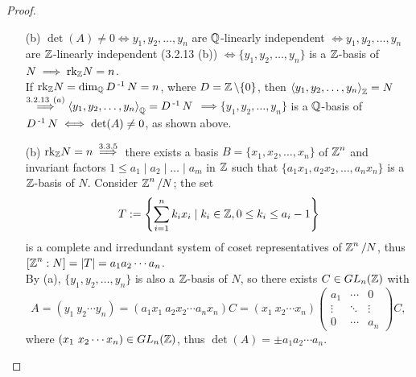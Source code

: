 \documentclass[11pt]{book}
\theoremstyle{definition}   \newtheorem{defn}[counter]{Definition} %
\newcommand{\bs}{\backslash}   \newcommand{\A}{\mathcal{A}}   \newcommand{\sy}{\textnormal{Syl}}   \newcommand{\size}[1]{\left| #1 \right|}
\newcommand{\mymatrix}[2]{\left( \begin{array}{#1} #2 \end{array} \right)}
\newcommand{\gen}[1]{\left\langle #1 \right\rangle}   \newcommand{\stab}[2]{\tn{Stab}_{#1}(#2)}   \newcommand{\fix}[2]{\tn{Fix}_{#1}(#2)}   \newcommand{\op}{^{\tn{op}}}
\newcommand{\vs}{\vspace{8pt}}
\numberwithin{counter}{chapter}
\begin{document}
\vs

\begin{proof}\
\begin{enumerate}
\item[(b)] $\det(A) \ne 0 \iff y_1,y_2,\dots,y_n $ are $\operatorname{\mathbb{Q}}$-linearly independent $\iff y_1,y_2,\dots,y_n$ are $\operatorname{\mathbb{Z}}$-linearly independent (3.2.13 (b)) $\iff \{y_1,y_2,\dots,y_n\}$ is a $\operatorname{\mathbb{Z}}$-basis of $N \implies \textnormal{rk}_{\operatorname{\mathbb{Z}}} N = n$. \\

If $\textnormal{rk}_{\operatorname{\mathbb{Z}}} N = \dim_{\operatorname{\mathbb{Q}}} D\operatorname{^{-1}} N = n$, where $D = \z\bs\{0\}$, then $\gen{y_1,y_2,\dots,y_n}_{\z} = N$ $\overset{3.2.13 \ (a)}{\implies} \gen{y_1,y_2,\dots,y_n}_{\Q} = D\inv N$ $\implies \{y_1,y_2,\dots,y_n\}$ is a $\operatorname{\mathbb{Q}}$-basis of $D\operatorname{^{-1}} N \iff \det (A) \ne 0$, as shown above.
\item[(b)] $\textnormal{rk}_{\operatorname{\mathbb{Z}}} N = n \overset{3.3.5}{\implies}$ there exists a basis $B = \{x_1,x_2,\dots,x_n\}$ of $\operatorname{\mathbb{Z}}^n$ and invariant factors $1 \leq a_1 \mid a_2 \mid \dots \mid a_m$ in $\operatorname{\mathbb{Z}}$ such that $\{a_1x_1,a_2x_2,\dots,a_n x_n\}$ is a $\operatorname{\mathbb{Z}}$-basis of $N$. Consider $\operatorname{\mathbb{Z}}^n/N$; the set
	\[T := \left\{\sum_{i=1}^n k_i x_i \mid k_i \in \operatorname{\mathbb{Z}}, 0 \leq k_i \leq a_i - 1\right\} \]
is a complete and irredundant system of coset representatives of $\operatorname{\mathbb{Z}}^n/N$, thus $[\operatorname{\mathbb{Z}}^n : N] = |T| = a_1 a_2 \cdots a_n$. \\

By (a), $\{y_1,y_2,\dots,y_n\}$ is also a $\operatorname{\mathbb{Z}}$-basis of $N$, so there exists $C \in GL_n(\operatorname{\mathbb{Z}})$ with  \[A = (y_1\ y_2 \cdots y_n) = (a_1x_1 \ a_2 x_2 \cdots a_n x_n) C = (x_1 \ x_2 \cdots x_n) \mymatrix{ccc}{a_1 & \cdots & 0 \\ \vdots & \ddots & \vdots \\ 0 & \cdots & a_n} C, \]
where $(x_1 \ x_2 \cdots x_n) \in GL_n(\operatorname{\mathbb{Z}})$, thus $\det(A) = \pm a_1 a_2 \cdots a_n$.
\end{enumerate}
\end{proof}

\vs
\end{document}
